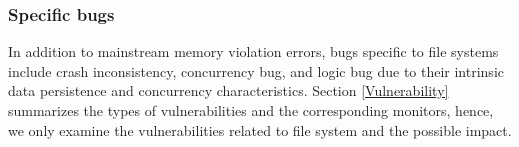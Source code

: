 \subsubsection{Specific bugs}
 In addition to mainstream memory violation errors, bugs specific to file systems include crash inconsistency, concurrency bug, and logic bug due to their intrinsic data persistence and concurrency characteristics. Section \ref{Vulnerability} summarizes the types of vulnerabilities and the corresponding monitors, hence, we only examine the vulnerabilities related to file system and the possible impact.

